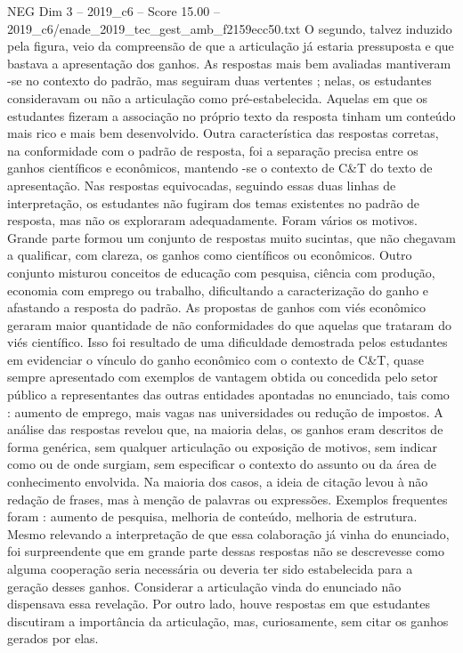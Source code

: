 \begin{textsample}{NEG Dim 3 – 2019\_c6 – Score 15.00 – 2019\_c6/enade\_2019\_tec\_gest\_amb\_f2159ecc50.txt}
O segundo, talvez induzido pela figura, veio da compreensão de que a articulação já estaria pressuposta e que bastava a apresentação dos ganhos.
As respostas mais bem avaliadas mantiveram -se no contexto do padrão, mas seguiram duas vertentes ; nelas, os estudantes consideravam ou não a articulação como pré-estabelecida.
Aquelas em que os estudantes fizeram a associação no próprio texto da resposta tinham um conteúdo mais rico e mais bem desenvolvido.
Outra característica das respostas corretas, na conformidade com o padrão de resposta, foi a separação precisa entre os ganhos científicos e econômicos, mantendo -se o contexto de C\&T do texto de apresentação.
Nas respostas equivocadas, seguindo essas duas linhas de interpretação, os estudantes não fugiram dos temas existentes no padrão de resposta, mas não os exploraram adequadamente.
Foram vários os motivos.
Grande parte formou um conjunto de respostas muito sucintas, que não chegavam a qualificar, com clareza, os ganhos como científicos ou econômicos.
Outro conjunto misturou conceitos de educação com pesquisa, ciência com produção, economia com emprego ou trabalho, dificultando a caracterização do ganho e afastando a resposta do padrão.
As propostas de ganhos com viés econômico geraram maior quantidade de não conformidades do que aquelas que trataram do viés científico.
Isso foi resultado de uma dificuldade demostrada pelos estudantes em evidenciar o vínculo do ganho econômico com o contexto de C\&T, quase sempre apresentado com exemplos de vantagem obtida ou concedida pelo setor público a representantes das outras entidades apontadas no enunciado, tais como : aumento de emprego, mais vagas nas universidades ou redução de impostos.
A análise das respostas revelou que, na maioria delas, os ganhos eram descritos de forma genérica, sem qualquer articulação ou exposição de motivos, sem indicar como ou de onde surgiam, sem especificar o contexto do assunto ou da área de conhecimento envolvida.
Na maioria dos casos, a ideia de citação levou à não redação de frases, mas à menção de palavras ou expressões.
Exemplos frequentes foram : aumento de pesquisa, melhoria de conteúdo, melhoria de estrutura.
Mesmo relevando a interpretação de que essa colaboração já vinha do enunciado, foi surpreendente que em grande parte dessas respostas não se descrevesse como alguma cooperação seria necessária ou deveria ter sido estabelecida para a geração desses ganhos.
Considerar a articulação vinda do enunciado não dispensava essa revelação.
Por outro lado, houve respostas em que estudantes discutiram a importância da articulação, mas, curiosamente, sem citar os ganhos gerados por elas.

\end{textsample}
